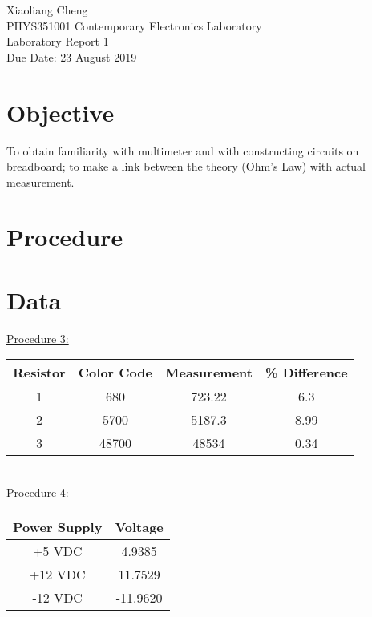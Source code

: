 \documentclass[letterpaper, 12pt]{article}
\begin{document}
	
	\noindent Xiaoliang Cheng\\
	\hfill PHYS351001 Contemporary Electronics Laboratory\\
	\hfill Laboratory Report 1\\ 
	\hfill Due Date: 23 August 2019
	
	
	\section*{Objective}
	To obtain familiarity with multimeter and with constructing circuits on breadboard; to make a link between the theory (Ohm's Law) with actual measurement.
	
	\section*{Procedure}
	
	
	\section*{Data}
	\underline{Procedure 3:}\\
	
	\begin{tabular}{c c c c}
		\toprule
		\bf Resistor & \bf Color Code & \bf Measurement & \bf \% Difference \\ \midrule
		1 & 680 & 723.22 & 6.3 \\
		2 & 5700  & 5187.3 & 8.99 \\
		3 & 48700 & 48534 & 0.34\\ \bottomrule
	\end{tabular}\\

	\noindent \underline{Procedure 4:}\\
	
	\begin{tabular}{c c}\toprule
		\bf Power Supply & \bf Voltage\\ \midrule
		+5 VDC & 4.9385\\
		+12 VDC  & 11.7529\\
		-12 VDC & -11.9620\\ \bottomrule
	\end{tabular}\\
\end{document}
